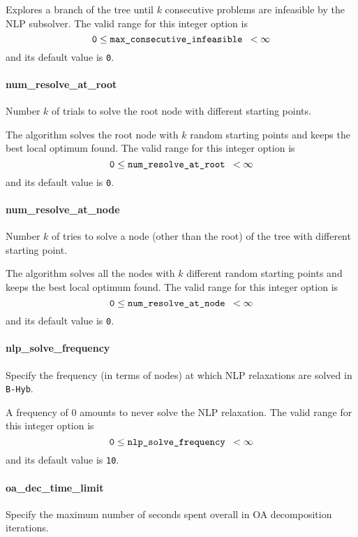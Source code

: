  Explores a branch of the tree
      until $k$ consecutive
problems are infeasible by the NLP subsolver. The valid range for
this integer option is
$${\tt 0} \le \hbox{\tt max\_consecutive\_infeasible } <  \infty$$
and its default value is {\tt 0}.


\paragraph{num\_resolve\_at\_root}
\label{num_resolve_at_root}
Number $k$ of trials to solve the root node with different starting points.

 The algorithm solves the root node with $k$
random starting points and keeps the best
local optimum found. The valid range for this integer option is
$${\tt 0} \le \hbox{\tt num\_resolve\_at\_root } <  \infty $$
and its default value is {\tt 0}.


\paragraph{num\_resolve\_at\_node}
\label{num_resolve_at_node}
Number $k$ of tries to solve a node (other than the root) of the tree with different starting point.

 The algorithm solves all the nodes with $k$
different random starting points and keeps
the best local optimum found. The valid range for this integer option is
$${\tt 0} \le \hbox{\tt num\_resolve\_at\_node } <  \infty$$
and its default value is {\tt 0}.




\paragraph{nlp\_solve\_frequency}
\label{nlp_solve_frequency}
Specify the frequency (in terms of nodes) at which NLP relaxations
are solved in {\tt B-Hyb}.

 A frequency of 0 amounts to never solve the
NLP relaxation. The valid range for this integer option is
$${\tt 0} \le \hbox{\tt nlp\_solve\_frequency } <  \infty$$
and its default value is {\tt 10}.


\paragraph{oa\_dec\_time\_limit}
\label{oa_dec_time_limit}
Specify the maximum number of seconds spent overall in OA decomposition iterations.

